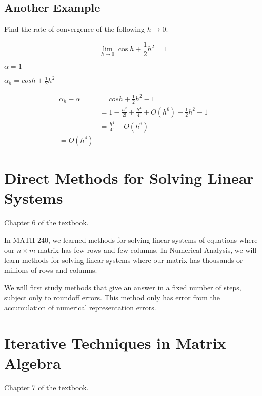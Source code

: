 \documentclass[12pt]{book}
\begin{document}
\section{Another Example}

Find the rate of convergence of the following $h\to 0$.

\begin{equation*}
  \lim_{h \to 0} \cos h + \frac{1}{2} h^2 = 1
\end{equation*}

$\alpha = 1$

$\alpha_h = cos h + \frac{1}{2} h^2$

\begin{align*}
  \alpha_h - \alpha &= cos h + \frac{1}{2} h^2 - 1\\
  &= 1-\frac{h^2}{2!}+\frac{h^4}{4!} + O(h^6) + \frac{1}{2}h^2 - 1 \\
  &= \frac{h^4}{4!} + O(h^6) \\
  = O(h^4)
\end{align*}

\chapter{Direct Methods for Solving Linear Systems}
\begin{greenquote}
  Chapter 6 of the textbook.
\end{greenquote}

In MATH 240, we learned methods for solving linear systems of equations where
our $n \times m$ matrix has few rows and few columns. In Numerical Analysis, we
will learn methods for solving linear systems where our matrix has thousands or
millions of rows and columns.

We will first study methods that give an answer in a fixed number of steps, 
subject only to roundoff errors. This method only has error from the accumulation
of numerical representation errors.







\chapter{Iterative Techniques in Matrix Algebra}
\begin{greenquote}
  Chapter 7 of the textbook.
\end{greenquote}
\end{document}
